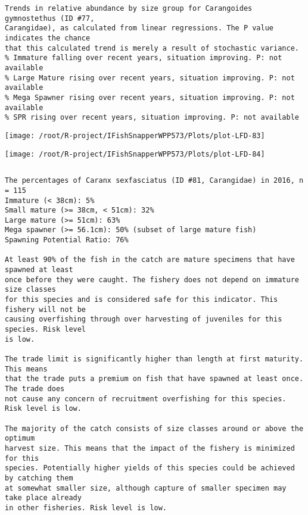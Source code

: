 \documentclass{report}\usepackage[]{graphicx}\usepackage[]{color}
\makeatletter
\def\maxwidth{ %
  \ifdim\Gin@nat@width>\linewidth
    \linewidth
  \else
    \Gin@nat@width
  \fi
}
\newenvironment{kframe}{%
 \def\at@end@of@kframe{}%
 \ifinner\ifhmode%
  \def\at@end@of@kframe{\end{minipage}}%
  \begin{minipage}{\columnwidth}%
 \fi\fi%
 \def\FrameCommand##1{\hskip\@totalleftmargin \hskip-\fboxsep
 \colorbox{shadecolor}{##1}\hskip-\fboxsep
     \hskip-\linewidth \hskip-\@totalleftmargin \hskip\columnwidth}%
 \MakeFramed {\advance\hsize-\width
   \@totalleftmargin\z@ \linewidth\hsize
   \@setminipage}}%
 {\par\unskip\endMakeFramed%
 \at@end@of@kframe}
\newenvironment{knitrout}{}{} %
\makeatother
\begin{document}
\begin{knitrout}
\begin{kframe}
\begin{verbatim}
Trends in relative abundance by size group for Carangoides gymnostethus (ID #77,
Carangidae), as calculated from linear regressions. The P value indicates the chance
that this calculated trend is merely a result of stochastic variance.
% Immature falling over recent years, situation improving. P: not available
% Large Mature rising over recent years, situation improving. P: not available
% Mega Spawner rising over recent years, situation improving. P: not available
% SPR rising over recent years, situation improving. P: not available
\end{verbatim}
\end{kframe}
\texttt{[image: /root/R-project/IFishSnapperWPP573/Plots/plot-LFD-83]} 

\texttt{[image: /root/R-project/IFishSnapperWPP573/Plots/plot-LFD-84]} 
\begin{kframe}\begin{verbatim}
\end{verbatim}
\end{kframe}
\clearpage
\newpage
\begin{kframe}\begin{verbatim}The percentages of Caranx sexfasciatus (ID #81, Carangidae) in 2016, n = 115
Immature (< 38cm): 5%
Small mature (>= 38cm, < 51cm): 32%
Large mature (>= 51cm): 63%
Mega spawner (>= 56.1cm): 50% (subset of large mature fish)
Spawning Potential Ratio: 76%
 
At least 90% of the fish in the catch are mature specimens that have spawned at least
once before they were caught. The fishery does not depend on immature size classes
for this species and is considered safe for this indicator. This fishery will not be
causing overfishing through over harvesting of juveniles for this species. Risk level
is low.

The trade limit is significantly higher than length at first maturity.  This means
that the trade puts a premium on fish that have spawned at least once. The trade does
not cause any concern of recruitment overfishing for this species. Risk level is low.

The majority of the catch consists of size classes around or above the optimum
harvest size. This means that the impact of the fishery is minimized for this
species. Potentially higher yields of this species could be achieved by catching them
at somewhat smaller size, although capture of smaller specimen may take place already
in other fisheries. Risk level is low.


\end{verbatim}
\end{kframe}
\end{knitrout}
\end{document}
